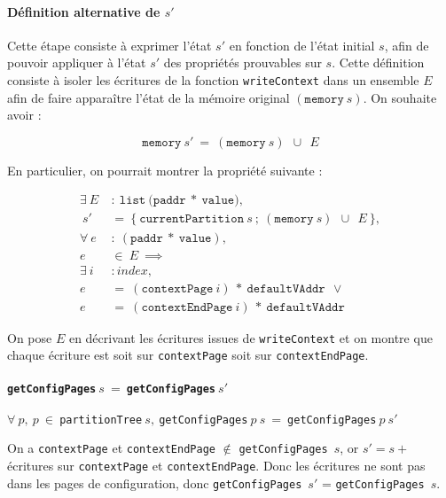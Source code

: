			\paragraph{Définition alternative de $s'$} Cette étape consiste à exprimer l'état $s'$ en fonction de l'état initial $s$, afin de pouvoir appliquer à l'état $s'$ des propriétés prouvables sur $s$. Cette définition consiste à isoler les écritures de la fonction \texttt{writeContext} dans un ensemble $E$ afin de faire apparaître l'état de la mémoire original $(\mathtt{memory}~s)$.
			On souhaite avoir :

			$$\mathtt{memory}~s'~=~(\mathtt{memory}~s)~~\cup~~E$$

			En particulier, on pourrait montrer la propriété suivante :

			\begin{align*}
				\exists~E~&:~\mathtt{list}~(\mathtt{paddr}~*~\mathtt{value)},\\
				      ~s'~&=~\mathtt{\{~currentPartition}~s~;~(\mathtt{memory}~s)~~\cup~~E~\mathtt{\}},\\
				\forall~e~&:~(\mathtt{paddr}~*~\mathtt{value}),\\
				        e~&\in~E~\implies\\
				\exists~i~&: index,\\
				        e~&=~(\mathtt{contextPage}~i)~*~\mathtt{defaultVAddr}~~\lor\\
				        e~&=~(\mathtt{contextEndPage}~i)~*~\mathtt{defaultVAddr}
			\end{align*}


			On pose $E$ en décrivant les écritures issues de \texttt{writeContext} et on montre que chaque écriture est soit sur \texttt{contextPage} soit sur \texttt{contextEndPage}.

			\paragraph{\texttt{getConfigPages}$~s~=~$\texttt{getConfigPages}$~s'$}$ $\\
			$\forall~p,~p~\in~$\texttt{partitionTree}$~s,~$\texttt{getConfigPages}$~p~s~=~$\texttt{getConfigPages}$~p~s'$

			On a \texttt{contextPage} et \texttt{contextEndPage} $\notin$ \texttt{getConfigPages}~$s$, or $s' = s +$ écritures sur \texttt{contextPage} et \texttt{contextEndPage}. Donc les écritures ne sont pas dans les pages de configuration, donc \texttt{getConfigPages}~$s'$ = \texttt{getConfigPages}~$s$.

